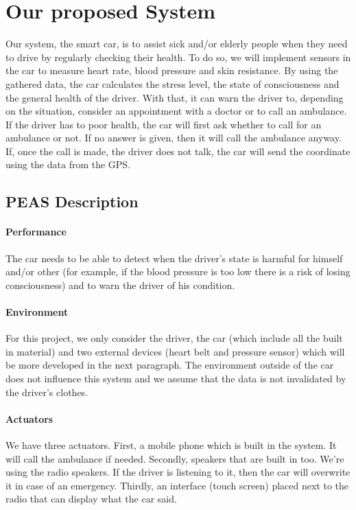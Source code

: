 \documentclass[a4paper]{article}
\begin{document}
\section{Our proposed System}
Our system, the smart car, is to assist sick and/or elderly people when they need to drive by regularly checking their health.
To do so, we will implement sensors in the car to measure heart rate, blood pressure and skin resistance. By using the gathered data, the car calculates the stress level, the state of consciousness and the general health of the driver. With that, it can warn the driver to, depending on the situation, consider an appointment with a doctor or to call an ambulance. If the driver has to poor health, the car will first ask whether to call for an ambulance or not. If no answer is given, then it will call the ambulance anyway. If, once the call is made, the driver does not talk, the car will send the coordinate using the data from the GPS.
\subsection{PEAS Description}
\paragraph{Performance} The car needs to be able to detect when the driver’s state is harmful for himself and/or other (for example, if the blood pressure is too low there is a risk of losing consciousness) and to warn the driver of his condition.

\paragraph{Environment} For this project, we only consider the driver, the car (which include all the built in material) and two external devices (heart belt and pressure sensor) which will be more developed in the next paragraph. The environment outside of the car does not influence this system and we assume that the data is not invalidated by the driver’s clothes.

\paragraph{Actuators} We have three actuators. First, a mobile phone which is built in the system. It will call the ambulance if needed. Secondly, speakers that are built in too. We’re using the radio speakers. If the driver is listening to it, then the car will overwrite it in case of an emergency. Thirdly, an interface (touch screen) placed next to the radio that can display what the car said.
\end{document}

